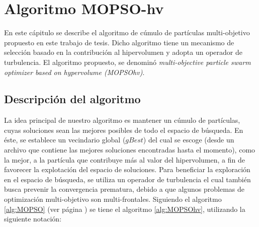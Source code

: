 \chapter{Algoritmo MOPSO-hv}

  En este c\'apitulo se describe el algoritmo de c\'umulo de part\'iculas multi-objetivo propuesto en este trabajo 
  de tesis. Dicho algoritmo tiene un mecanismo de selecci\'on basado en la contribuci\'on al hipervolumen y adopta un operador de turbulencia.
  El algoritmo propuesto, se denomin\'o \textit{multi-objective particle swarm optimizer based on hypervolume (MOPSOhv)}. 
  
\section*{Descripci\'on del algoritmo}
 
 La idea principal de nuestro algoritmo es mantener un c\'umulo de part\'iculas, cuyas soluciones sean las mejores posibles de todo el 
 espacio de b\'usqueda. 
 En \'este, se establece un vecindario global ($gBest$) del cual se escoge (desde un archivo que contiene las mejores soluciones 
 encontradas hasta el momento), como la mejor, a la part\'icula que contribuye m\'as al valor del hipervolumen, a fin de favorecer la 
 explotaci\'on del espacio de soluciones. Para beneficiar la exploraci\'on en el espacio de b\'usqueda, se utiliza un operador de 
 turbulencia el cual tambi\'en busca prevenir la convergencia prematura, debido a que algunos problemas de optimizaci\'on multi-objetivo son 
 multi-frontales. Siguiendo el algoritmo \ref{alg:MOPSO} 
 (ver p\'agina \pageref{alg:MOPSO}) se tiene el algoritmo \ref{alg:MOPSOhv}, utilizando la siguiente notaci\'on:

 
